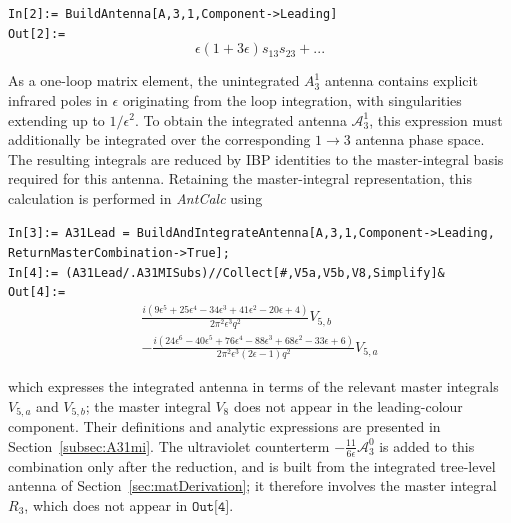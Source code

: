 \begin{mdframed}[backgroundcolor=gray!10, linewidth=0pt]
\texttt{In[2]:= BuildAntenna[A,3,1,Component->Leading]}\\
\hfill
\texttt{Out[2]:=}
    \begin{equation*}
        \epsilon(1+3\epsilon)s_{13}s_{23}+...
    \end{equation*}
\end{mdframed}

As a one-loop matrix element, the unintegrated $A_3^1$ antenna contains explicit
infrared poles in $\epsilon$ originating from the loop integration, with
singularities extending up to $1/\epsilon^2$. To obtain the integrated antenna
$\mathcal A_3^1$, this expression must additionally be integrated over the
corresponding $1\to3$ antenna phase space. The resulting integrals are reduced by IBP
identities to the master-integral basis required for this antenna. Retaining the
master-integral representation, this calculation is performed in \textit{AntCalc}
using

\begin{mdframed}[backgroundcolor=gray!10, linewidth=0pt]
\texttt{In[3]:= A31Lead = BuildAndIntegrateAntenna[A,3,1,Component->Leading,\\ReturnMasterCombination->True];}\\
\texttt{In[4]:= (A31Lead/.A31MISubs)//Collect[\#,{V5a,V5b,V8},Simplify]\&}\\
\hfill
\texttt{Out[4]:=}
    \begin{equation*}
        \begin{gathered}
            \frac{i\left(9\epsilon^5+25\epsilon^4-34\epsilon^3+41\epsilon^2-20\epsilon+4\right)}{2\pi^2\epsilon^3q^2}V_{5,b}\\
            -\frac{i\left(24\epsilon^6-40\epsilon^5+76\epsilon^4-88\epsilon^3+68\epsilon^2-33\epsilon+6\right)}{2\pi^2\epsilon^3(2\epsilon-1)q^2}V_{5,a}
        \end{gathered}
    \end{equation*}
\end{mdframed}

which expresses the integrated antenna in terms of the relevant master integrals
$V_{5,a}$ and $V_{5,b}$; the master integral $V_8$ does not appear in the leading-colour
component. Their definitions and analytic expressions are presented in
Section~\ref{subsec:A31mi}. The ultraviolet counterterm $-\frac{11}{6\epsilon}\mathcal A_3^0$
is added to this combination only after the reduction, and is built from the integrated
tree-level antenna of Section~\ref{sec:matDerivation}; it therefore involves the master
integral $R_3$, which does not appear in $\texttt{Out[4]}$.

